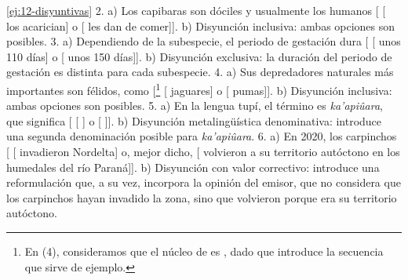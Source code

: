 \begin{solucion}{\ref{ej:12-disyuntivas}}
2. a) Los capibaras son dóciles y usualmente los humanos [
[ los acarician] o [ les dan de comer]].
b) Disyunción inclusiva: ambas opciones son posibles. 3. a) Dependiendo de la
subespecie, el periodo de gestación dura [ [ unos 110
días] o [ unos 150 días]]. b) Disyunción exclusiva: la
duración del periodo de gestación es distinta para cada subespecie. 4. a) Sus
depredadores naturales más importantes son félidos, como
[\footnote{En (4), consideramos que el núcleo de  es , dado que introduce la secuencia que sirve de
ejemplo.} [ jaguares] o [ pumas]]. b)
Disyunción inclusiva: ambas opciones son posibles. 5. a) En la lengua tupí, el
término es \textit{ka'apiûara}, que significa [ [
] o [ ]]. b) Disyunción metalingüística denominativa: introduce una segunda
denominación posible para \textit{ka'apiûara}. 6. a) En 2020, los carpinchos
[ [ invadieron Nordelta] o, mejor dicho,
[ volvieron a su territorio autóctono en los humedales del río
Paraná]]. b) Disyunción con valor correctivo: introduce una reformulación que, a
su vez, incorpora la opinión del emisor, que no considera que los carpinchos
hayan invadido la zona, sino que volvieron porque era su territorio autóctono.
\end{solucion}

